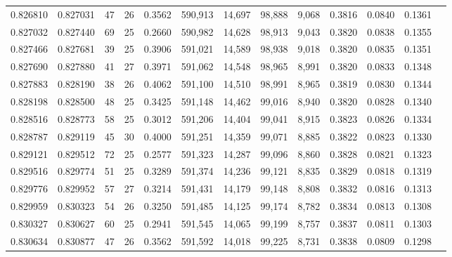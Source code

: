 \begin{tabular}{rrrrrrrrrrrrr}
0.826810 & 0.827031 &    47 &  26 &                                     0.3562 & 590,913 &  14,697 &  98,888 &   9,068 & 0.3816 & 0.0840 & 0.1361 \\
0.827032 & 0.827440 &    69 &  25 &                                     0.2660 & 590,982 &  14,628 &  98,913 &   9,043 & 0.3820 & 0.0838 & 0.1355 \\
0.827466 & 0.827681 &    39 &  25 &                                     0.3906 & 591,021 &  14,589 &  98,938 &   9,018 & 0.3820 & 0.0835 & 0.1351 \\
0.827690 & 0.827880 &    41 &  27 &                                     0.3971 & 591,062 &  14,548 &  98,965 &   8,991 & 0.3820 & 0.0833 & 0.1348 \\
0.827883 & 0.828190 &    38 &  26 &                                     0.4062 & 591,100 &  14,510 &  98,991 &   8,965 & 0.3819 & 0.0830 & 0.1344 \\
0.828198 & 0.828500 &    48 &  25 &                                     0.3425 & 591,148 &  14,462 &  99,016 &   8,940 & 0.3820 & 0.0828 & 0.1340 \\
0.828516 & 0.828773 &    58 &  25 &                                     0.3012 & 591,206 &  14,404 &  99,041 &   8,915 & 0.3823 & 0.0826 & 0.1334 \\
0.828787 & 0.829119 &    45 &  30 &                                     0.4000 & 591,251 &  14,359 &  99,071 &   8,885 & 0.3822 & 0.0823 & 0.1330 \\
0.829121 & 0.829512 &    72 &  25 &                                     0.2577 & 591,323 &  14,287 &  99,096 &   8,860 & 0.3828 & 0.0821 & 0.1323 \\
0.829516 & 0.829774 &    51 &  25 &                                     0.3289 & 591,374 &  14,236 &  99,121 &   8,835 & 0.3829 & 0.0818 & 0.1319 \\
0.829776 & 0.829952 &    57 &  27 &                                     0.3214 & 591,431 &  14,179 &  99,148 &   8,808 & 0.3832 & 0.0816 & 0.1313 \\
0.829959 & 0.830323 &    54 &  26 &                                     0.3250 & 591,485 &  14,125 &  99,174 &   8,782 & 0.3834 & 0.0813 & 0.1308 \\
0.830327 & 0.830627 &    60 &  25 &                                     0.2941 & 591,545 &  14,065 &  99,199 &   8,757 & 0.3837 & 0.0811 & 0.1303 \\
0.830634 & 0.830877 &    47 &  26 &                                     0.3562 & 591,592 &  14,018 &  99,225 &   8,731 & 0.3838 & 0.0809 & 0.1298 \\

\end{tabular}
